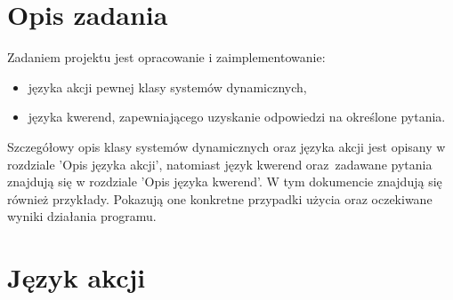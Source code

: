 

\maketitle
\tableofcontents

\newpage

\section{Opis zadania}
Zadaniem projektu jest opracowanie i zaimplementowanie:
\begin{itemize}
\item języka akcji pewnej klasy systemów dynamicznych,
\item języka kwerend, zapewniającego uzyskanie odpowiedzi na określone pytania.
\end{itemize}
Szczegółowy opis klasy systemów dynamicznych oraz języka akcji jest opisany w rozdziale 'Opis języka akcji',
natomiast język kwerend oraz~zadawane pytania znajdują się w rozdziale 'Opis języka kwerend'.
W tym dokumencie znajdują się również przykłady.
Pokazują one konkretne przypadki użycia oraz oczekiwane wyniki działania programu.

\section{Język akcji}

